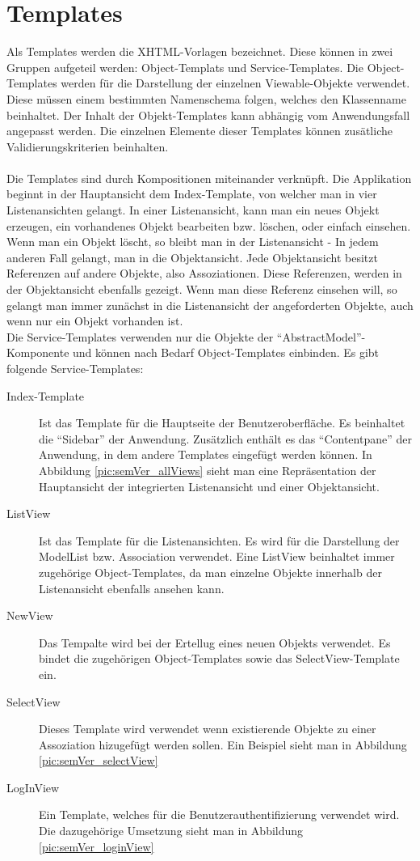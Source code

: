 \section{Templates}
Als Templates werden die XHTML-Vorlagen bezeichnet. Diese können in zwei Gruppen aufgeteil werden: Object-Templats und Service-Templates.
Die Object-Templates werden für die Darstellung der einzelnen Viewable-Objekte verwendet. Diese müssen einem bestimmten Namenschema folgen, welches
den Klassenname beinhaltet. Der Inhalt der Objekt-Templates kann abhängig vom Anwendungsfall angepasst werden. Die einzelnen Elemente 
dieser Templates können zusätliche Validierungskriterien beinhalten.\\
\\
Die Templates sind durch Kompositionen miteinander verknüpft. 
Die Applikation beginnt in der Hauptansicht dem Index-Template, von welcher man in vier Listenansichten gelangt. In einer Listenansicht, 
kann man ein neues Objekt erzeugen, ein vorhandenes Objekt bearbeiten bzw. löschen, oder einfach einsehen. Wenn man ein Objekt löscht, so bleibt man in der Listenansicht - 
In jedem anderen Fall gelangt, man in die Objektansicht.
Jede Objektansicht besitzt Referenzen auf andere Objekte, also Assoziationen. Diese Referenzen, werden in der Objektansicht ebenfalls 
gezeigt. Wenn man diese Referenz einsehen will, so gelangt man immer zunächst in die Listenansicht der angeforderten Objekte, 
auch wenn nur ein Objekt vorhanden ist.
\\
Die Service-Templates verwenden nur die Objekte der \enquote{AbstractModel}-Komponente und können nach Bedarf Object-Templates einbinden.
Es gibt folgende Service-Templates:\\
\begin{description}
\item[Index-Template] 
Ist das Template für die Hauptseite der Benutzeroberfläche. Es beinhaltet die \enquote{Sidebar} der Anwendung. Zusätzlich enthält es das \enquote{Contentpane} der Anwendung, in dem andere 
Templates eingefügt werden können. In Abbildung \ref{pic:semVer_allViews} sieht man eine Repräsentation der Hauptansicht der integrierten Listenansicht und einer Objektansicht.
\item[ListView]
Ist das Template für die Listenansichten. Es wird für die Darstellung der ModelList bzw. Association verwendet. Eine ListView beinhaltet immer zugehörige Object-Templates, da
man einzelne Objekte innerhalb der Listenansicht ebenfalls ansehen kann.
\item[NewView]
Das Tempalte wird bei der Ertellug eines neuen Objekts verwendet. Es bindet die zugehörigen Object-Templates sowie das SelectView-Template ein.
\item[SelectView]
Dieses Template wird verwendet wenn existierende Objekte zu einer Assoziation hizugefügt werden sollen. Ein Beispiel sieht man in Abbildung \ref{pic:semVer_selectView}
\item[LogInView]
Ein Template, welches für die Benutzerauthentifizierung verwendet wird. Die dazugehörige Umsetzung sieht man in Abbildung \ref{pic:semVer_loginView}
\end{description}


